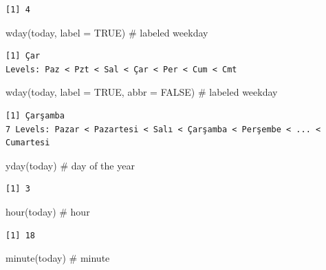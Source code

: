\documentclass[
  letterpaper,
  DIV=11,
  numbers=noendperiod]{scrreprt}
\newenvironment{Shaded}{\begin{snugshade}}{\end{snugshade}}
\newcommand{\AttributeTok}[1]{\textcolor[rgb]{0.40,0.45,0.13}{#1}}
\newcommand{\CommentTok}[1]{\textcolor[rgb]{0.37,0.37,0.37}{#1}}
\newcommand{\ConstantTok}[1]{\textcolor[rgb]{0.56,0.35,0.01}{#1}}
\newcommand{\FunctionTok}[1]{\textcolor[rgb]{0.28,0.35,0.67}{#1}}
\newcommand{\NormalTok}[1]{\textcolor[rgb]{0.00,0.23,0.31}{#1}}
\begin{document}
\begin{verbatim}
[1] 4
\end{verbatim}

\begin{Shaded}
\begin{Highlighting}[]
\FunctionTok{wday}\NormalTok{(today, }\AttributeTok{label =} \ConstantTok{TRUE}\NormalTok{) }\CommentTok{\# labeled weekday}
\end{Highlighting}
\end{Shaded}

\begin{verbatim}
[1] Çar
Levels: Paz < Pzt < Sal < Çar < Per < Cum < Cmt
\end{verbatim}

\begin{Shaded}
\begin{Highlighting}[]
\FunctionTok{wday}\NormalTok{(today, }\AttributeTok{label =} \ConstantTok{TRUE}\NormalTok{, }\AttributeTok{abbr =} \ConstantTok{FALSE}\NormalTok{) }\CommentTok{\# labeled weekday}
\end{Highlighting}
\end{Shaded}

\begin{verbatim}
[1] Çarşamba
7 Levels: Pazar < Pazartesi < Salı < Çarşamba < Perşembe < ... < Cumartesi
\end{verbatim}

\begin{Shaded}
\begin{Highlighting}[]
\FunctionTok{yday}\NormalTok{(today) }\CommentTok{\# day of the year}
\end{Highlighting}
\end{Shaded}

\begin{verbatim}
[1] 3
\end{verbatim}

\begin{Shaded}
\begin{Highlighting}[]
\FunctionTok{hour}\NormalTok{(today) }\CommentTok{\# hour}
\end{Highlighting}
\end{Shaded}

\begin{verbatim}
[1] 18
\end{verbatim}

\begin{Shaded}
\begin{Highlighting}[]
\FunctionTok{minute}\NormalTok{(today) }\CommentTok{\# minute}
\end{Highlighting}
\end{Shaded}
\end{document}
